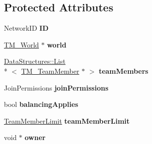 \subsection*{Protected Attributes}
\begin{DoxyCompactItemize}
\item 
\hypertarget{class_rak_net_1_1_t_m___team_aee801b0ab28abf3929d75357eeae1ba6}{Network\-I\-D {\bfseries I\-D}}\label{class_rak_net_1_1_t_m___team_aee801b0ab28abf3929d75357eeae1ba6}

\item 
\hypertarget{class_rak_net_1_1_t_m___team_a3d6a9cfa6ae2db36b1c7d36ed91abcf7}{\hyperlink{class_rak_net_1_1_t_m___world}{T\-M\-\_\-\-World} $\ast$ {\bfseries world}}\label{class_rak_net_1_1_t_m___team_a3d6a9cfa6ae2db36b1c7d36ed91abcf7}

\item 
\hypertarget{class_rak_net_1_1_t_m___team_a561f046ee39b4cf97c338d6b9edf3fec}{\hyperlink{class_data_structures_1_1_list}{Data\-Structures\-::\-List}\\*
$<$ \hyperlink{class_rak_net_1_1_t_m___team_member}{T\-M\-\_\-\-Team\-Member} $\ast$ $>$ {\bfseries team\-Members}}\label{class_rak_net_1_1_t_m___team_a561f046ee39b4cf97c338d6b9edf3fec}

\item 
\hypertarget{class_rak_net_1_1_t_m___team_a123e6cc50d64fc090db70261d07b7d4a}{Join\-Permissions {\bfseries join\-Permissions}}\label{class_rak_net_1_1_t_m___team_a123e6cc50d64fc090db70261d07b7d4a}

\item 
\hypertarget{class_rak_net_1_1_t_m___team_aa1821be65b9c0fb819367d50bf190c31}{bool {\bfseries balancing\-Applies}}\label{class_rak_net_1_1_t_m___team_aa1821be65b9c0fb819367d50bf190c31}

\item 
\hypertarget{class_rak_net_1_1_t_m___team_a27c0c3e4edb747ee8c20913a318852e9}{\hyperlink{group___t_e_a_m___m_a_n_a_g_e_r___g_r_o_u_p_ga236290d3c5e0d6b3b4559ba851f02bed}{Team\-Member\-Limit} {\bfseries team\-Member\-Limit}}\label{class_rak_net_1_1_t_m___team_a27c0c3e4edb747ee8c20913a318852e9}

\item 
\hypertarget{class_rak_net_1_1_t_m___team_a785562c63ab18667d7699c928069c1f7}{void $\ast$ {\bfseries owner}}\label{class_rak_net_1_1_t_m___team_a785562c63ab18667d7699c928069c1f7}

\end{DoxyCompactItemize}
